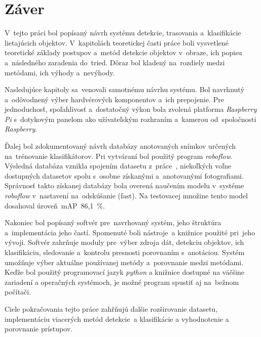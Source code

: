 \chapter*{Záver}
{}


V~tejto práci bol popísaný návrh systému detekcie, trasovania a~klasifikácie lietajúcich objektov. V~kapitolách teoretickej časti práce boli vysvetlené teoretické základy postupov a~metód detekcie objektov v~obraze, ich popisu a~následného zaradenia do~tried. Dôraz bol kladený na~rozdiely medzi metódami, ich výhody a~nevýhody.

Nasledujúce kapitoly sa~venovali samotnému návrhu systému. Bol navrhnutý a~odôvodnený výber hardvérových komponentov a~ich prepojenie. Pre jednoduchosť, spoľahlivosť a~dostatočný výkon bola zvolená platforma \emph{Raspberry Pi} s~dotykovým panelom ako užívateľským rozhraním a~kamerou od~spoločnosti \emph{Raspberry}.

Ďalej bol zdokumentovaný návrh databázy anotovaných snímkov určených na~trénovanie klasifikátorov. Pri vytváraní bol použitý program \emph{roboflow}. Výsledná databáza vznikla spojením datasetu z~práce~\cite{Jurecka2021}, niekoľkých voľne dostupných datasetov spolu s~osobne získanými a~anotovanými fotografiami. Správnosť takto získanej databázy bola overená naučením modelu v~systéme \emph{roboflow} v~nastavení na~odskúšanie (fast). Na testovacej množine tento model dosahoval úroveň~\ac{mAP}~86,1~\%.

Nakoniec bol popísaný softvér pre~navrhovaný systém, jeho štruktúra a~implementácia jeho častí. Spomenuté boli nástroje~a knižnice použité pri~jeho vývoji. Softvér zahrňuje moduly pre~výber zdroja dát, detekciu objektov, ich klasifikáciu, sledovanie a~kontrolu presnosti porovnaním s~anotáciou. Systém umožňuje výber aktuálne používanej metódy a~porovnanie medzi metódami. Keďže bol použitý programovací jazyk \emph{python} a knižnice dostupné na väčšine zariadení a operačných systémoch, je možné program spustiť aj na~bežnom počítači.

Ciele pokračovania tejto práce zahřňujú ďalšie rozširovanie datasetu, implementáciu viacerých metód detekcie~a klasifikácie a vyhodnotenie a porovnanie prístupov.